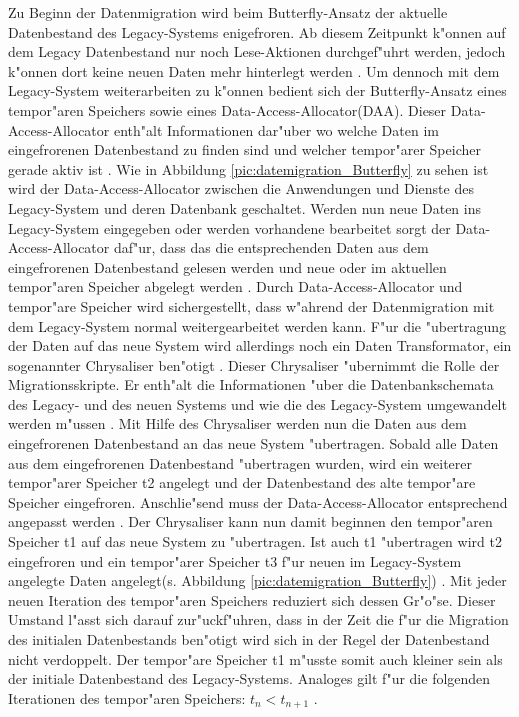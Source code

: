 Zu Beginn der Datenmigration wird beim Butterfly-Ansatz der aktuelle Datenbestand des Legacy-Systems enigefroren. Ab diesem Zeitpunkt k"onnen auf dem Legacy Datenbestand nur noch Lese-Aktionen durchgef"uhrt werden, jedoch k"onnen dort keine neuen Daten mehr hinterlegt werden \citep[S.~202]{wuLawlessBisbal-1997}. Um dennoch mit dem Legacy-System weiterarbeiten zu k"onnen bedient sich der Butterfly-Ansatz eines tempor"aren Speichers sowie eines Data-Access-Allocator(DAA). Dieser Data-Access-Allocator enth"alt Informationen dar"uber wo welche Daten im eingefrorenen Datenbestand zu finden sind und welcher tempor"arer Speicher gerade aktiv ist \citep[S.~202]{wuLawlessBisbal-1997}. Wie in Abbildung \ref{pic:datemigration_Butterfly} zu sehen ist wird der Data-Access-Allocator zwischen die Anwendungen und Dienste des Legacy-System und deren Datenbank geschaltet. Werden nun neue Daten ins Legacy-System eingegeben oder werden vorhandene bearbeitet sorgt der Data-Access-Allocator daf"ur, dass das die entsprechenden Daten aus dem eingefrorenen Datenbestand gelesen werden und neue oder im aktuellen tempor"aren Speicher abgelegt werden \citep[S.~202]{wuLawlessBisbal-1997}.
\lb
Durch Data-Access-Allocator und tempor"are Speicher wird sichergestellt, dass w"ahrend der Datenmigration mit dem Legacy-System normal weitergearbeitet werden kann. F"ur die "ubertragung der Daten auf das neue System wird allerdings noch ein Daten Transformator, ein sogenannter Chrysaliser ben"otigt \citep[S.~202]{wuLawlessBisbal-1997}. Dieser Chrysaliser "ubernimmt die Rolle der Migrationsskripte. Er enth"alt die Informationen "uber die Datenbankschemata des Legacy- und des neuen Systems und wie die des Legacy-System umgewandelt werden m"ussen \citep[S.~202]{wuLawlessBisbal-1997}. 
\lb
Mit Hilfe des Chrysaliser werden nun die Daten aus dem eingefrorenen Datenbestand an das neue System "ubertragen. Sobald alle Daten aus dem eingefrorenen Datenbestand "ubertragen wurden, wird ein weiterer tempor"arer Speicher t2 angelegt und der Datenbestand des alte tempor"are Speicher eingefroren. Anschlie"send muss der Data-Access-Allocator entsprechend angepasst werden \citep[S.~202]{wuLawlessBisbal-1997}. Der Chrysaliser kann nun damit beginnen den tempor"aren Speicher t1 auf das neue System zu "ubertragen. Ist auch t1 "ubertragen wird t2 eingefroren und ein tempor"arer Speicher t3 f"ur neuen im Legacy-System angelegte Daten angelegt(s. Abbildung \ref{pic:datemigration_Butterfly}) \citep[S.~202]{wuLawlessBisbal-1997}. Mit jeder neuen Iteration des tempor"aren Speichers reduziert sich dessen Gr"o"se. Dieser Umstand l"asst sich darauf zur"uckf"uhren, dass in der Zeit die f"ur die Migration des initialen Datenbestands ben"otigt wird sich in der Regel der Datenbestand nicht verdoppelt. Der tempor"are Speicher t1 m"usste somit auch kleiner sein als der initiale Datenbestand des Legacy-Systems. Analoges gilt f"ur die folgenden Iterationen des tempor"aren Speichers: \textbf{$t_n <t_{n+1}$} \citep[S.~202]{wuLawlessBisbal-1997}. 
